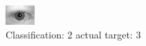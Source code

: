 \begin{figure}[h!]
\begin{center}
\includegraphics[width=0.60\columnwidth]{figures/ID675_class_2_target_3.png}
\end{center}
\caption{ Classification: 2 actual target: 3}
\label{fig:ID675_class_2_target_3}
\end{figure}
